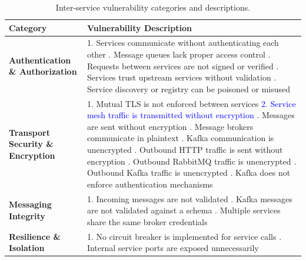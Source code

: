 \documentclass[preprint,12pt]{elsarticle}
\newcommand{\new}[1]{\textcolor{blue}{#1}}
\newcommand{\safefixtablestyle}{%
  \small
  \setlength{\tabcolsep}{5pt}
  \renewcommand{\arraystretch}{1.15}
}
\begin{document}
\begin{table}[!t]
\centering
\caption{Inter-service vulnerability categories and descriptions.}
\label{tab:isv_categories}
\safefixtablestyle
\renewcommand{\arraystretch}{1.25}
\begin{tabularx}{\linewidth}{@{} L{3.6cm} Y @{}}
\toprule
\textbf{Category} & \textbf{Vulnerability Description} \\
\midrule
\textbf{Authentication \& Authorization} &
1. Services communicate without authenticating each other . Message queues lack proper access control . Requests between services are not signed or verified . Services trust upstream services without validation . Service discovery or registry can be poisoned or misused \\
\midrule
\textbf{Transport Security \& Encryption} &
1. Mutual TLS is not enforced between services \newline
\new{2. Service mesh traffic is transmitted without encryption} . Messages are sent without encryption . Message brokers communicate in plaintext . Kafka communication is unencrypted . Outbound HTTP traffic is sent without encryption . Outbound RabbitMQ traffic is unencrypted . Outbound Kafka traffic is unencrypted . Kafka does not enforce authentication mechanisms \\
\midrule
\textbf{Messaging Integrity} &
1. Incoming messages are not validated . Kafka messages are not validated against a schema . Multiple services share the same broker credentials \\
\midrule
\textbf{Resilience \& Isolation} &
1. No circuit breaker is implemented for service calls . Internal service ports are exposed unnecessarily \\
\bottomrule
\end{tabularx}
\end{table}
\end{document}
